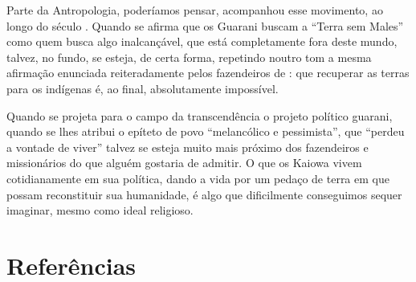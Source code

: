 Parte da Antropologia, poderíamos pensar, acompanhou esse movimento, ao
longo do século . Quando se afirma que os Guarani buscam a ``Terra sem
Males'' como quem busca algo inalcançável, que está completamente fora
deste mundo, talvez, no fundo, se esteja, de certa forma, repetindo
noutro tom a mesma afirmação enunciada reiteradamente pelos fazendeiros
de : que recuperar as terras para os indígenas é, ao final,
absolutamente impossível.

Quando se projeta para o campo da transcendência o projeto político
guarani, quando se lhes atribui o epíteto de povo ``melancólico e
pessimista'', que ``perdeu a vontade de viver'' talvez se esteja muito
mais próximo dos fazendeiros e missionários do que alguém gostaria de
admitir. O que os Kaiowa vivem cotidianamente em sua política, dando a
vida por um pedaço de terra em que possam reconstituir sua humanidade,
é algo que dificilmente conseguimos sequer imaginar, mesmo como ideal
religioso.

\section{Referências}

